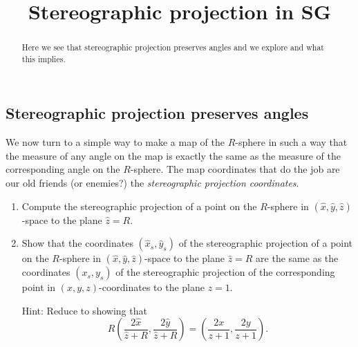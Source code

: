 \documentclass{ximera}
\title{Stereographic projection in \textbf{SG}}
\begin{document}
\begin{abstract}
Here we see that stereographic projection preserves angles and we
explore and what this implies. 
\end{abstract}
\maketitle


\subsection*{Stereographic projection preserves angles}

We now turn to a simple way to make a map of the $R$-sphere in such a
way that the measure of any angle on the map is exactly the same as
the measure of the corresponding angle on the $R$-sphere. The map
coordinates that do the job are our old friends (or enemies?) the
\textit{stereographic projection coordinates}.

\begin{exercise}\hfil
\begin{enumerate}
\item Compute the stereographic projection of a point on the
  $R$-sphere in $\left( \hat{x},\hat{y},\hat{z}\right) $-space to the
  plane $\hat{z}=R$.

\item Show that the coordinates $\left( \hat{x}_{s},\hat{y}_{s}\right)
  $ of the stereographic projection of a point on the $R$-sphere in
  $\left( \hat{x},\hat{y},\hat{z}\right) $-space to the plane
  $\hat{z}=R$ are the same as the coordinates $\left(
  x_{s},y_{s}\right) $ of the stereographic projection of the
  corresponding point in $\left( x,y,z\right) $-coordinates to the
  plane $z=1$.

Hint: Reduce to showing that%
\[
R\left(  \frac{2\hat{x}}{\hat{z}+R},\frac{2\hat{y}}{\hat{z}+R}\right)
=\left(  \frac{2x}{z+1},\frac{2y}{z+1}\right)  .
\]
\end{enumerate}
\end{exercise}
\end{document}
